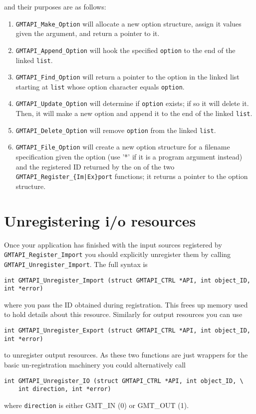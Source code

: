 \documentclass{report}
\newcommand{\GMT}{\textit{GMT}}%
\newcommand{\GMT}{\htmladdnormallink{\texttt{[image: eps/GMT\_glyph10.eps]}}{http://gmt.soest.hawaii.edu}}%
\newcommand{\GMT}{\htmladdnormallink{\textbf{GMT}}{http://gmt.soest.hawaii.edu}}%
\begin{document}
and their purposes are as follows:
\begin{enumerate}
\item \texttt{GMTAPI\_Make\_Option} will allocate a new option structure, assign it values
given the argument, and return a pointer to it.
\item \texttt{GMTAPI\_Append\_Option} will hook the specified \texttt{option} to the end
of the linked \texttt{list}.
\item \texttt{GMTAPI\_Find\_Option} will return a pointer to the option in the linked list starting
at \texttt{list} whose option character equals \texttt{option}.
\item \texttt{GMTAPI\_Update\_Option} will determine if \texttt{option} exists; if so it will delete it.
Then, it will make a new option and append it to the end of the linked \texttt{list}.
\item \texttt{GMTAPI\_Delete\_Option} will remove \texttt{option} from the linked \texttt{list}.
\item \texttt{GMTAPI\_File\_Option} will create a new option structure for a filename specification
given the option (use '*' if it is a program argument instead) and the registered ID returned by the
on of the two \texttt{GMTAPI\_Register\_\{Im|Ex\}port} functions; it
returns a pointer to the option structure.
\end{enumerate}

\section{Unregistering i/o resources}
\index{GMT@\GMT!Unregistering i/o resources}

Once your application has finished with the input sources registered by
\texttt{GMTAPI\_Register\_Import} you should explicitly unregister them by calling
\texttt{GMTAPI\_Unregister\_Import}.  The full syntax is
\begin{verbatim}
int GMTAPI_Unregister_Import (struct GMTAPI_CTRL *API, int object_ID, int *error)
\end{verbatim}
where you pass the ID obtained during registration.  This frees up memory used to hold
details about this resource.  Similarly for output resources you can use
\begin{verbatim}
int GMTAPI_Unregister_Export (struct GMTAPI_CTRL *API, int object_ID, int *error)
\end{verbatim}
to unregister output resources.  As these two functions are just wrappers for the basic
un-registration machinery you could alternatively call
\begin{verbatim}
int GMTAPI_Unregister_IO (struct GMTAPI_CTRL *API, int object_ID, \
    int direction, int *error)
\end{verbatim}
where \texttt{direction} is either GMT\_IN (0) or GMT\_OUT (1).
\end{document}
